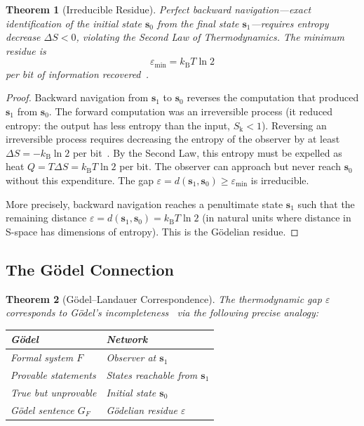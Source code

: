 \documentclass[11pt,twocolumn,a4paper]{article}
\newtheorem{theorem}{Theorem}[section]
\theoremstyle{definition}
\newcommand{\Sk}{S_{\mathrm{k}}}
\newcommand{\kB}{k_{\mathrm{B}}}
\newcommand{\eps}{\varepsilon}
\begin{document}
\begin{theorem}[Irreducible Residue]\label{thm:residue}
Perfect backward navigation---exact identification of the initial state $\mathbf{s}_0$
from the final state $\mathbf{s}_1$---requires entropy decrease $\Delta S < 0$, violating
the Second Law of Thermodynamics. The minimum residue is
\begin{equation}\label{eq:residue}
  \eps_{\min} = \kB T \ln 2
\end{equation}
per bit of information recovered~\cite{landauer1961}.
\end{theorem}

\begin{proof}
Backward navigation from $\mathbf{s}_1$ to $\mathbf{s}_0$ reverses the computation that
produced $\mathbf{s}_1$ from $\mathbf{s}_0$. The forward computation was an irreversible
process (it reduced entropy: the output has less entropy than the input, $\Sk < 1$).
Reversing an irreversible process requires decreasing the entropy of the observer by at
least $\Delta S = -\kB \ln 2$ per bit~\cite{landauer1961}. By the Second Law, this
entropy must be expelled as heat $Q = T\Delta S = \kB T \ln 2$ per bit. The observer
can approach but never reach $\mathbf{s}_0$ without this expenditure. The gap
$\eps = d(\mathbf{s}_1, \mathbf{s}_0) \geq \eps_{\min}$ is irreducible.

More precisely, backward navigation reaches a penultimate state $\mathbf{s}_1$ such that
the remaining distance $\eps = d(\mathbf{s}_1, \mathbf{s}_0) = \kB T \ln 2$ (in natural
units where distance in S-space has dimensions of entropy). This is the G\"odelian residue.
\end{proof}

\subsection{The G\"odel Connection}\label{sec:godelian:godel}

\begin{theorem}[G\"odel--Landauer Correspondence]\label{thm:godel_landauer}
The thermodynamic gap $\eps$ corresponds to G\"odel's incompleteness~\cite{godel1931}
via the following precise analogy:
\begin{center}
\begin{tabular}{ll}
\toprule
\textbf{G\"odel} & \textbf{Network} \\
\midrule
Formal system $F$ & Observer at $\mathbf{s}_1$ \\
Provable statements & States reachable from $\mathbf{s}_1$ \\
True but unprovable & Initial state $\mathbf{s}_0$ \\
G\"odel sentence $G_F$ & G\"odelian residue $\eps$ \\
\bottomrule
\end{tabular}
\end{center}
\end{theorem}
\end{document}
